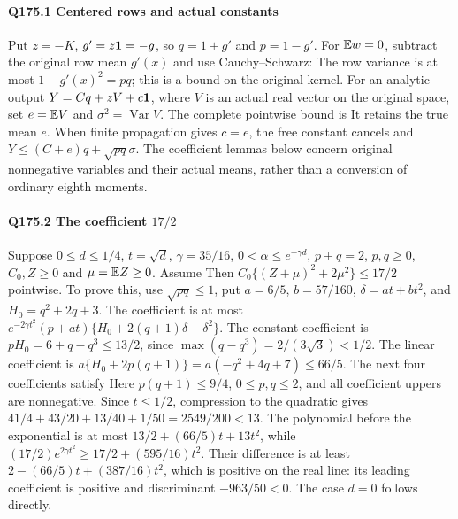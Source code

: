 \paragraph{Q175.1 Centered rows and actual constants}\label{part:Q175.1}
Put $z=\allowbreak -K$, $g'=\allowbreak z\mathbf1=\allowbreak -g$, so $q=\allowbreak 1+g'$ and $p=\allowbreak 1-g'$.
For $\mathbb E w=\allowbreak 0$, subtract the original row mean $g'(x)$ and use Cauchy--Schwarz:
The row variance is at most $1-g'(x)^2=\allowbreak pq$; this is a bound on the
original kernel. For an analytic output $Y=\allowbreak Cq+zV+c\mathbf1$, where $V$
is an actual real vector on the original space, set $e=\allowbreak \mathbb E V$ and
$\sigma^2=\allowbreak \operatorname{Var}V$. The complete pointwise bound is
It retains the true mean $e$. When finite propagation gives $c=\allowbreak e$,
the free constant cancels and $Y\le\allowbreak (C+e)q+\sqrt{pq}\sigma$.
The coefficient lemmas below concern original nonnegative variables and
their actual means, rather than a conversion of ordinary eighth moments.

\paragraph{Q175.2 The coefficient $17/2$}\label{part:Q175.2}
Suppose $0\le\allowbreak  d\le\allowbreak 1/4$, $t=\allowbreak \sqrt d$, $\gamma=\allowbreak 35/16$,
$0<\allowbreak \alpha\le\allowbreak  e^{-\gamma d}$, $p+q=\allowbreak 2$, $p,\allowbreak q\ge\allowbreak 0$,
$C_0,\allowbreak Z\ge\allowbreak 0$ and $\mu=\allowbreak \mathbb E Z\ge\allowbreak 0$. Assume
Then $C_0\{(Z+\mu)^2+2\mu^2\}\le\allowbreak 17/2$ pointwise.
To prove this, use $\sqrt{pq}\le\allowbreak 1$, put $a=\allowbreak 6/5$, $b=\allowbreak 57/160$,
$\delta=\allowbreak at+bt^2$, and $H_0=\allowbreak q^2+2q+3$.
The coefficient is at most
$e^{-2\gamma t^2}(p+at)\{H_0+2(q+1)\delta+\delta^2\}$.
The constant coefficient is $pH_0=\allowbreak 6+q-q^3\le\allowbreak 13/2$, since
$\max(q-q^3)=\allowbreak 2/(3\sqrt3)<\allowbreak 1/2$.
The linear coefficient is $a\{H_0+2p(q+1)\}
=a(-q^2+4q+7)\le66/5$.
The next four coefficients satisfy
Here $p(q+1)\le\allowbreak 9/4$, $0\le\allowbreak  p,\allowbreak q\le\allowbreak 2$, and all coefficient uppers are
nonnegative. Since $t\le\allowbreak 1/2$, compression to the quadratic gives
$41/4+43/20+13/40+1/50=\allowbreak 2549/200<\allowbreak 13$.
The polynomial before the exponential is at most
$13/2+(66/5)t+13t^2$, while
$(17/2)e^{2\gamma t^2}\ge\allowbreak 17/2+(595/16)t^2$.
Their difference is at least $2-(66/5)t+(387/16)t^2$, which is positive
on the real line: its leading coefficient is positive and discriminant
$-963/50<\allowbreak 0$. The case $d=\allowbreak 0$ follows directly.

